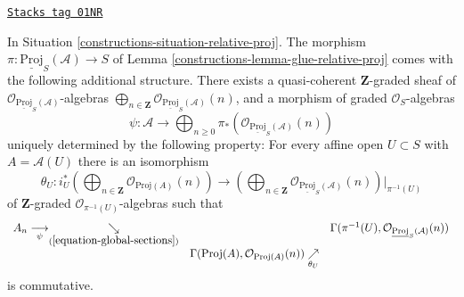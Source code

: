 \begin{lemma}
\label{constructions-lemma-glue-relative-proj-twists}
\href{https://stacks.math.columbia.edu/tag/01NR}{\texttt{Stacks tag 01NR}}

In Situation \ref{constructions-situation-relative-proj}.
The morphism $\pi : \underline{\text{Proj}}_S(\mathcal{A}) \to S$
of Lemma \ref{constructions-lemma-glue-relative-proj} comes with the following
additional structure.
There exists a quasi-coherent $\mathbf{Z}$-graded sheaf
of $\mathcal{O}_{\underline{\text{Proj}}_S(\mathcal{A})}$-algebras
$\bigoplus\nolimits_{n \in \mathbf{Z}}
\mathcal{O}_{\underline{\text{Proj}}_S(\mathcal{A})}(n)$,
and a morphism of graded $\mathcal{O}_S$-algebras
$$
\psi :
\mathcal{A}
\longrightarrow
\bigoplus\nolimits_{n \geq 0}
\pi_*\left(\mathcal{O}_{\underline{\text{Proj}}_S(\mathcal{A})}(n)\right)
$$
uniquely determined by the following property:
For every affine open $U \subset S$ with $A = \mathcal{A}(U)$
there is an isomorphism
$$
\theta_U :
i_U^*\left(
\bigoplus\nolimits_{n \in \mathbf{Z}} \mathcal{O}_{\text{Proj}(A)}(n)
\right)
\longrightarrow
\left(
\bigoplus\nolimits_{n \in \mathbf{Z}}
\mathcal{O}_{\underline{\text{Proj}}_S(\mathcal{A})}(n)
\right)|_{\pi^{-1}(U)}
$$
of $\mathbf{Z}$-graded $\mathcal{O}_{\pi^{-1}(U)}$-algebras
such that
$$
\begin{array}{ccc}A_n
\underset{\psi}{\longrightarrow}\underset{(\ref{equation-global-sections})}{\searrow} &  & \Gamma(\pi^{-1}(U),
\mathcal{O}_{\underline{\text{Proj}}_S(\mathcal{A})}(n)) \\  & \Gamma(\text{Proj}(A),
\mathcal{O}_{\text{Proj}(A)}(n))
\underset{\theta_U}{\nearrow} & \end{array}
$$
is commutative.
\end{lemma}

